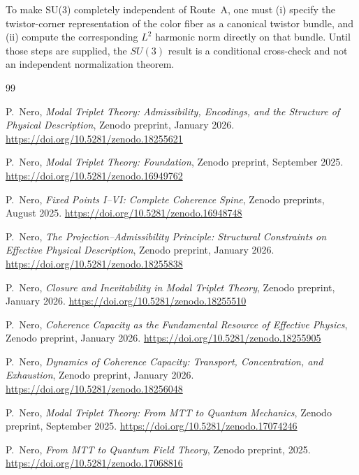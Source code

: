 \documentclass[11pt]{article}
\begin{document}
\begin{remark}
To make SU(3) completely independent of Route~A, one must (i) specify the twistor-corner
representation of the color fiber as a canonical twistor bundle, and (ii) compute the
corresponding $L^2$ harmonic norm directly on that bundle. Until those steps are supplied, the $SU(3)$ result is a conditional
cross-check and not an independent normalization theorem.
\end{remark}
\begin{thebibliography}{99}

P.~Nero,
\emph{Modal Triplet Theory: Admissibility, Encodings, and the Structure of Physical Description},
Zenodo preprint, January 2026.
\url{https://doi.org/10.5281/zenodo.18255621}

P.~Nero,
\emph{Modal Triplet Theory: Foundation},
Zenodo preprint, September 2025.
\url{https://doi.org/10.5281/zenodo.16949762}

P.~Nero,
\emph{Fixed Points I--VI: Complete Coherence Spine},
Zenodo preprints, August 2025.
\url{https://doi.org/10.5281/zenodo.16948748}

P.~Nero,
\emph{The Projection--Admissibility Principle: Structural Constraints on Effective Physical Description},
Zenodo preprint, January 2026.
\url{https://doi.org/10.5281/zenodo.18255838}

P.~Nero,
\emph{Closure and Inevitability in Modal Triplet Theory},
Zenodo preprint, January 2026.
\url{https://doi.org/10.5281/zenodo.18255510}

P.~Nero,
\emph{Coherence Capacity as the Fundamental Resource of Effective Physics},
Zenodo preprint, January 2026.
\url{https://doi.org/10.5281/zenodo.18255905}

P.~Nero,
\emph{Dynamics of Coherence Capacity: Transport, Concentration, and Exhaustion},
Zenodo preprint, January 2026.
\url{https://doi.org/10.5281/zenodo.18256048}

P.~Nero,
\emph{Modal Triplet Theory: From MTT to Quantum Mechanics},
Zenodo preprint, September 2025.
\url{https://doi.org/10.5281/zenodo.17074246}

P.~Nero,
\emph{From MTT to Quantum Field Theory},
Zenodo preprint, 2025.
\url{https://doi.org/10.5281/zenodo.17068816}


\end{thebibliography}
\end{document}
